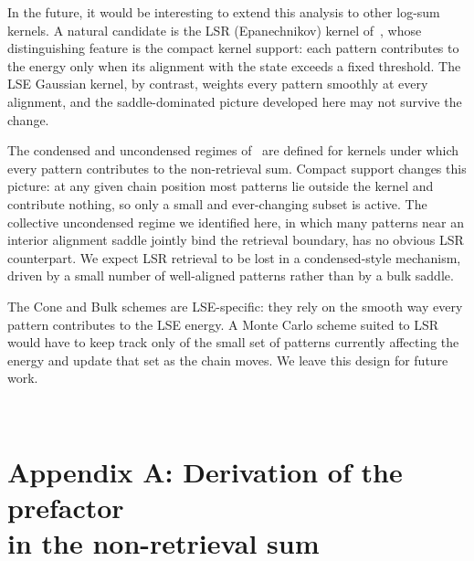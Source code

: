 \documentclass[letterpaper]{article} %
\begin{document}
In the future, it would be interesting to extend this analysis to other log-sum kernels. A natural candidate is the LSR (Epanechnikov) kernel of~\citet{hoover2025dense}, whose distinguishing feature is the compact kernel support: each pattern contributes to the energy only when its alignment with the state exceeds a fixed threshold. The LSE Gaussian kernel, by contrast, weights every pattern smoothly at every alignment, and the saddle-dominated picture developed here may not survive the change.

The condensed and uncondensed regimes of~\citet{lucibello2024exponential} are defined for kernels under which every pattern contributes to the non-retrieval sum. Compact support changes this picture: at any given chain position most patterns lie outside the kernel and contribute nothing, so only a small and ever-changing subset is active. The collective uncondensed regime we identified here, in which many patterns near an interior alignment saddle jointly bind the retrieval boundary, has no obvious LSR counterpart. We expect LSR retrieval to be lost in a condensed-style mechanism, driven by a small number of well-aligned patterns rather than by a bulk saddle.

The Cone and Bulk schemes are LSE-specific: they rely on the smooth way every pattern contributes to the LSE energy. A Monte Carlo scheme suited to LSR would have to keep track only of the small set of patterns currently affecting the energy and update that set as the chain moves. We leave this design for future work.








\newpage
~

\newpage

\appendix

\section{Appendix A: Derivation of the prefactor \\in the non-retrieval sum}
\end{document}
